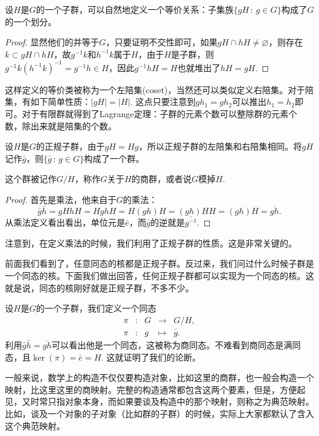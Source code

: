 \begin{pro}
	设$H$是$G$的一个子群，可以自然地定义一个等价关系：子集族$\{gH\,:\, g\in G\}$构成了$G$的一个划分。
\end{pro}

\begin{proof}
	显然他们的并等于$G$，只要证明不交性即可，如果$gH\cap hH\neq \varnothing$，则存在$k\subset gH\cap hH$，故$g^{-1}k$和$h^{-1}k$属于$H$，由于$H$是子群，则$g^{-1}k\left(h^{-1}k\right)^{-1}=g^{-1}h\in H$，因此$g^{-1}hH=H$也就堆出了$hH=gH$.
\end{proof}

这样定义的等价类被称为一个左陪集(coset)，当然还可以类似定义右陪集。对于陪集，有如下简单性质：$|gH|=|H|$. 这点只要注意到$gh_1=gh_2$可以推出$h_1=h_2$即可。对于有限群就得到了Lagrange定理：子群的元素个数可以整除群的元素个数，除出来就是陪集的个数。

\begin{pro}
	设$H$是$G$的正规子群，由于$gH=Hg$，所以正规子群的左陪集和右陪集相同。将$gH$记作$\bar{g}$，则$\{\bar{g}\,:\, g\in G\}$构成了一个群。
\end{pro}

这个群被记作$G/H$，称作$G$关于$H$的商群，或者说$G$模掉$H$.

\begin{proof}
首先是乘法，他来自于$G$的乘法：
\[
	\bar{g}\bar{h}=gHhH=HghH=H(gh)H=(gh)HH=(gh)H=\overline{gh}.
\]
从乘法定义看出看出，单位元是$\bar{e}$，而$\bar{g}$的逆就是$\overline{g^{-1}}$. 
\end{proof}

注意到，在定义乘法的时候，我们利用了正规子群的性质。这是非常关键的。

\para[商群] 前面我们看到了，任意同态的核都是正规子群。反过来，我们问过什么时候子群是一个同态的核。下面我们做出回答，任何正规子群都可以实现为一个同态的核。这就是说，同态的核刚好就是正规子群，不多不少。

设$H$是$G$的一个子群，我们定义一个同态
\[
	\begin{array}{ccccc}
		\pi &:&G &\to& G/H,\\
		\pi &:&g &\mapsto& \bar{g}.
	\end{array}
\]
利用$\bar{g}\bar{h}=\overline{gh}$可以看出他是一个同态，这被称为商同态。不难看到商同态是满同态，且$\ker(\pi)=\bar{e}=H$. 这就证明了我们的论断。

一般来说，数学上的构造不仅仅要构造对象，比如这里的商群，也一般会构造一个映射，比这里这里的商映射。完整的构造通常都包含这两个要素，但是，方便起见，又时常只指对象本身，而如果要谈及构造中的那个映射，则称之为典范映射。比如，谈及一个对象的子对象（比如群的子群）的时候，实际上大家都默认了含入这个典范映射。
\endpara

